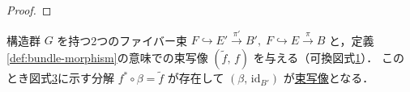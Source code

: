 \documentclass[algtopo_main]{subfiles}
\begin{document}
\begin{proof}
    
\end{proof}

\begin{myprop}[]{}
    構造群 $G$ を持つ2つのファイバー束 $F \hookrightarrow E' \xrightarrow{\pi'} B',\; F \hookrightarrow E \xrightarrow{\pi} B$ と，定義\ref{def:bundle-morphism}の意味での束写像 $(\tilde{f},\, f)$ を与える（可換図式\ref{cmtd:prop-FBp-1}）．
    このとき図式\ref{cmtd:prop-FBp-2}に示す分解  $f^* \circ \beta = \tilde{f}$ が存在して $(\beta,\, \mathrm{id}_{B'})$ が\hyperref[def:bundle-morphism]{束写像}となる．
\end{myprop}

\begin{figure}[H]
    \centering
    \begin{subfigure}{0.4\columnwidth}
        \centering
        \caption{}
        \label{cmtd:prop-FBp-1}
    \end{subfigure}
    \hspace{5mm}
    \begin{subfigure}{0.4\columnwidth}
        \centering
        \caption{}
        \label{cmtd:prop-FBp-2}
    \end{subfigure}
\end{figure}%
\end{document}

